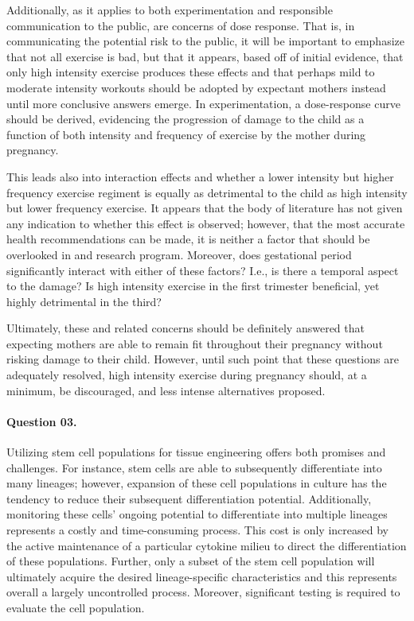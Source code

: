 \documentclass[11pt,letterpaper,final] {article}
\begin{document}
Additionally, as it applies to both experimentation and responsible communication to the public, are concerns of dose response. That is, in communicating the potential risk to the public, it will be important to emphasize that not all exercise is bad, but that it appears, based off of initial evidence, that only high intensity exercise produces these effects and that perhaps mild to moderate intensity workouts should be adopted by expectant mothers instead until more conclusive answers emerge. In experimentation, a dose-response curve should be derived, evidencing the progression of damage to the child as a function of both intensity and frequency of exercise by the mother during pregnancy.

This leads also into interaction effects and whether a lower intensity but higher frequency exercise regiment is equally as detrimental to the child as high intensity but lower frequency exercise. It appears that the body of literature has not given any indication to whether this effect is observed; however, that the most accurate health recommendations can be made, it is neither a factor that should be overlooked in and research program. Moreover, does gestational period significantly interact with either of these factors? I.e., is there a temporal aspect to the damage? Is high intensity exercise in the first trimester beneficial, yet highly detrimental in the third?

Ultimately, these and related concerns should be definitely answered that expecting mothers are able to remain fit throughout their pregnancy without risking damage to their child. However, until such point that these questions are adequately resolved, high intensity exercise during pregnancy should, at a minimum, be discouraged, and less intense alternatives proposed.

\paragraph{Question 03.} Utilizing stem cell populations for tissue engineering offers both promises and challenges. For instance, stem cells are able to subsequently differentiate into many lineages; however, expansion of these cell populations in culture has the tendency to reduce their subsequent differentiation potential. Additionally, monitoring these cells' ongoing potential to differentiate into multiple lineages represents a costly and time-consuming process. This cost is only increased by the active maintenance of a particular cytokine milieu to direct the differentiation of these populations. Further, only a subset of the stem cell population will ultimately acquire the desired lineage-specific characteristics and this represents overall a largely uncontrolled process. Moreover, significant testing is required to evaluate the cell population.
\end{document}
